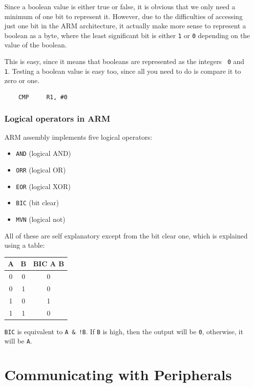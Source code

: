 Since a boolean value is either true or false, it is obvious that we only need a
minimum of one bit to represent it. However, due to the difficulties of
accessing just one bit in the ARM architecture, it actually make more sense to
represent a boolean as a byte, where the least significant bit is either {\tt 1}
or {\tt 0} depending on the value of the boolean.

This is easy, since it means that booleans are represented as the integers {\tt
0} and {\tt 1}. Testing a boolean value is easy too, since all you need to do is
compare it to zero or one.

\begin{verbatim}
	CMP 	R1, #0
\end{verbatim}

\subsubsection{Logical operators in ARM}

ARM assembly implements five logical operators:

\begin{itemize}

	\item {\tt AND} (logical AND)
	\item {\tt ORR} (logical OR)
	\item {\tt EOR} (logical XOR)
	\item {\tt BIC} (bit clear)
	\item {\tt MVN} (logical not)

\end{itemize}

All of these are self explanatory except from the bit clear one, which is
explained using a table:

\begin{center}
	\begin{tabular}{|c|c|c}
		A & B & BIC A B\\ \hline
		0 & 0 & 0\\
		0 & 1 & 0\\
		1 & 0 & 1\\
		1 & 1 & 0\\
	\end{tabular}
\end{center}

{\tt BIC} is equivalent to {\tt A \& !B}. If {\tt B} is high, then the output will
be {\tt 0}, otherwise, it will be {\tt A}.

\section{Communicating with Peripherals}

